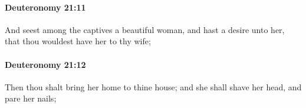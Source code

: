 		\paragraph{Deuteronomy 21:11} %
			\label{DEUTERONOMY-21-11}

			And seest among the captives a beautiful woman, and hast a desire unto her, that thou wouldest have her to thy wife;


		\paragraph{Deuteronomy 21:12} %
			\label{DEUTERONOMY-21-12}

			Then thou shalt bring her home to thine house; and she shall shave her head, and pare her nails;


